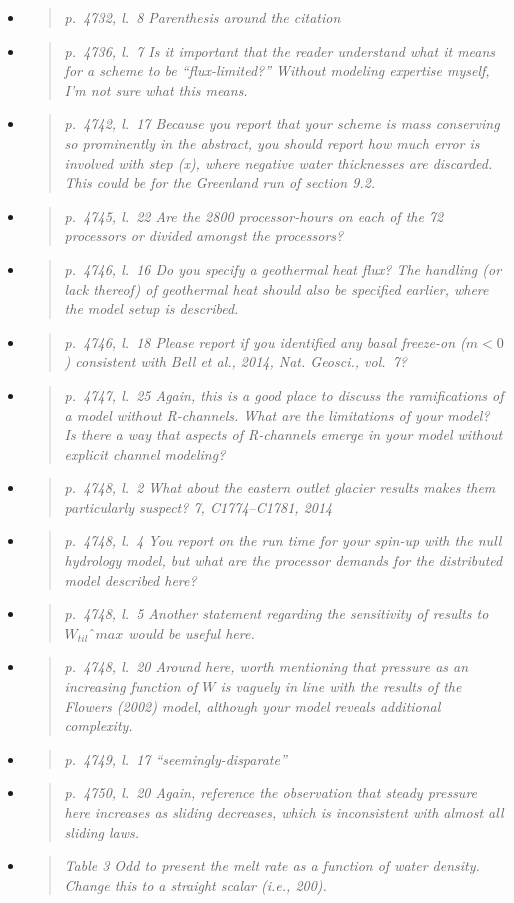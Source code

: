 \documentclass[11pt,reqno]{amsart}
\newcommand{\reply}[2]{
\medskip\medskip
\item  \begin{quote}
\emph{#1}
\end{quote}

\medskip
\noindent #2}
\begin{document}
\begin{itemize}
\reply{p.~4732, l.~8 Parenthesis around the citation}
{}

\reply{p.~4736, l.~7 Is it important that the reader understand what it means for a scheme to
be “flux-limited?” Without modeling expertise myself, I’m not sure what this means.}
{}

\reply{p.~4742, l.~17 Because you report that your scheme is mass conserving so prominently
in the abstract, you should report how much error is involved with step (x), where
negative water thicknesses are discarded. This could be for the Greenland run of
section 9.2.}
{}

\reply{p.~4745, l.~22 Are the 2800 processor-hours on each of the 72 processors or divided
amongst the processors?}
{}

\reply{p.~4746, l.~16 Do you specify a geothermal heat flux? The handling (or lack thereof) of
geothermal heat should also be specified earlier, where the model setup is described.}
{}

\reply{p.~4746, l.~18 Please report if you identified any basal freeze-on ($m < 0$) consistent with
Bell et al., 2014, Nat. Geosci., vol.~7?}
{}

\reply{p.~4747, l.~25 Again, this is a good place to discuss the ramifications of a model without
R-channels. What are the limitations of your model? Is there a way that aspects of R-channels emerge in your model without explicit channel modeling?}
{}

\reply{p.~4748, l.~2 What about the eastern outlet glacier results makes them particularly
suspect? 7, C1774--C1781, 2014}
{}

\reply{p.~4748, l.~4 You report on the run time for your spin-up with the null hydrology model,
but what are the processor demands for the distributed model described here?}
{}

\reply{p.~4748, l.~5 Another statement regarding the sensitivity of results to $W_{til}ˆ{max}$ would
be useful here.}
{}

\reply{p.~4748, l.~20 Around here, worth mentioning that pressure as an increasing function of
$W$ is vaguely in line with the results of the Flowers (2002) model, although your model
reveals additional complexity.}
{}

\reply{p.~4749, l.~17 “seemingly-disparate”}
{}

\reply{p.~4750, l.~20 Again, reference the observation that steady pressure here increases as
sliding decreases, which is inconsistent with almost all sliding laws.}
{}

\reply{Table 3 Odd to present the melt rate as a function of water density. Change this to a
straight scalar (i.e., 200).}
{}
\end{itemize}
\end{document}
